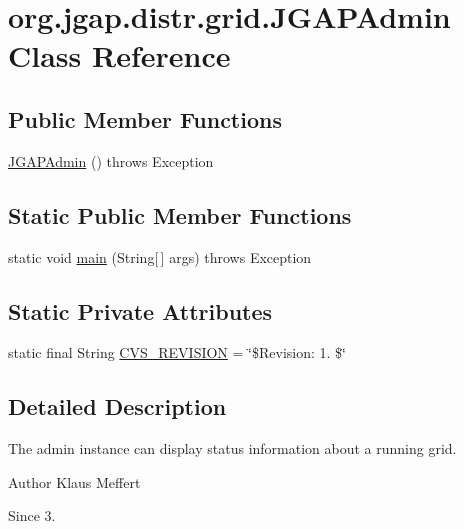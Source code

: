\hypertarget{classorg_1_1jgap_1_1distr_1_1grid_1_1_j_g_a_p_admin}{\section{org.\-jgap.\-distr.\-grid.\-J\-G\-A\-P\-Admin Class Reference}
\label{classorg_1_1jgap_1_1distr_1_1grid_1_1_j_g_a_p_admin}
}
\subsection*{Public Member Functions}
\begin{DoxyCompactItemize}
\item 
\hyperlink{classorg_1_1jgap_1_1distr_1_1grid_1_1_j_g_a_p_admin_a1a3ba1f9646b3e85100249f3ccc4353a}{J\-G\-A\-P\-Admin} ()  throws Exception 
\end{DoxyCompactItemize}
\subsection*{Static Public Member Functions}
\begin{DoxyCompactItemize}
\item 
static void \hyperlink{classorg_1_1jgap_1_1distr_1_1grid_1_1_j_g_a_p_admin_aa6651384744d7798b91a71e3f68b012d}{main} (String\mbox{[}$\,$\mbox{]} args)  throws Exception 
\end{DoxyCompactItemize}
\subsection*{Static Private Attributes}
\begin{DoxyCompactItemize}
\item 
static final String \hyperlink{classorg_1_1jgap_1_1distr_1_1grid_1_1_j_g_a_p_admin_a35f7f6ea50cdc1d6138507bfd876ec78}{C\-V\-S\-\_\-\-R\-E\-V\-I\-S\-I\-O\-N} = \char`\"{}\$Revision\-: 1. \$\char`\"{}
\end{DoxyCompactItemize}


\subsection{Detailed Description}
The admin instance can display status information about a running grid.

\begin{DoxyAuthor}{Author}
Klaus Meffert 
\end{DoxyAuthor}
\begin{DoxySince}{Since}
3. 
\end{DoxySince}


